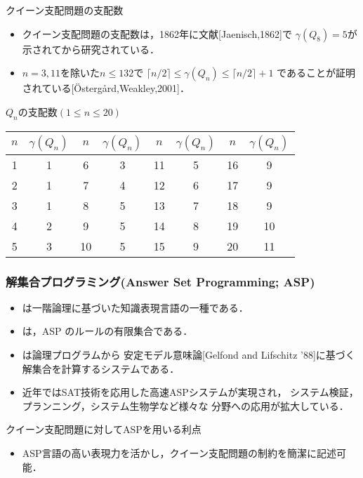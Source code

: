 \documentclass[dvipdfmx,10pt]{beamer}
\begin{document}
\begin{frame}{クイーン支配問題の支配数}
  \begin{itemize}
    \item クイーン支配問題の支配数は，1862年に文献[Jaenisch,1862]で
	    $\gamma(Q_8)=5$が示されてから研究されている．
    \item $n=3,11$を除いた$n \leq 132$で $\lceil n/2 \rceil 
	    \leq \gamma(Q_{n}) \leq \lceil n/2 \rceil +1$
	 であることが証明されている[\"{O}sterg{\aa}rd,Weakley,2001]．
  \end{itemize}
 \begin{exampleblock}{$Q_{n}$の支配数$(1 \leq n \leq 20)$}
  \centering
  \begin{tabular}{c|c||c|c||c|c||c|c}%
    $n$ & $\gamma(Q_{n})$ & $n$ & $\gamma(Q_{n})$ &$n$ & $\gamma(Q_{n})$ &$n$ & $\gamma(Q_{n})$ \\ \hline
    1 &1 &6 &3 &11 &5 &16 &9 \\ %
    2 &1 &7 &4 &12 &6 &17 &9 \\ %
    3 &1 &8 &5 &13 &7 &18 &9 \\ %
    4 &2 &9 &5 &14 &8 &19 &10 \\ %
    5 &3 &10 &5 &15 &9 &20 &11 \\ %
  \end{tabular}
 \end{exampleblock}
\end{frame}

%
%

\begin{frame}\frametitle{解集合プログラミング(Answer Set Programming; ASP)}
 \begin{itemize}
  \item {}は一階論理に基づいた知識表現言語の一種である．
  \item {}は，ASP のルールの有限集合である．
  \item {}は論理プログラムから
	安定モデル意味論[Gelfond and Lifschitz '88]に基づく
	解集合を計算するシステムである．
  \item 近年ではSAT技術を応用した高速ASPシステムが実現され，
	システム検証，プランニング，システム生物学など様々な
	分野への応用が拡大している．
 \end{itemize}
 \begin{alertblock}{クイーン支配問題に対してASPを用いる利点}
  \begin{itemize}
   \item ASP言語の高い表現力を活かし，クイーン支配問題の制約を簡潔に記述可能．
  \end{itemize}
 \end{alertblock}
\end{frame}
 
\end{document}
